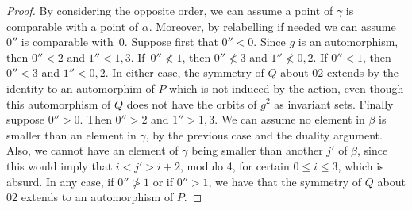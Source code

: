 \documentclass[ALCO,published]{cedram}
\begin{document}
\begin{proof}
By considering the opposite order, we can assume a point of $\gamma$ is comparable with a point of $\alpha$. Moreover, by relabelling if needed we can assume $0''$ is comparable with~$0$. Suppose first that $0''<0$. Since $g$ is an automorphism, then $0''<2$ and $1''<1,3$. If~$0''\nless 1$, then $0''\nless 3$ and $1''\nless 0,2$. If $0''<1$, then $0''<3$ and $1''<0,2$. In either case, the symmetry of $Q$ about $02$ extends by the identity to an automorphim of $P$ which is not induced by the action, even though this automorphism of $Q$ does not have the orbits of $g^2$ as invariant sets. Finally suppose $0''>0$. Then $0''>2$ and $1''>1,3$. We can assume no element in $\beta$ is smaller than an element in $\gamma$, by the previous case and the duality argument. Also, we cannot have an element of $\gamma$ being smaller than another $j'$ of $\beta$, since this would imply that $i<j'>i+2$, modulo 4, for certain $0\le i\le 3$, which is absurd. In any case, if $0''\ngtr 1$ or if $0''>1$, we have that the symmetry of $Q$ about $02$ extends to an automorphism of $P$. 
\end{proof}
\end{document}
